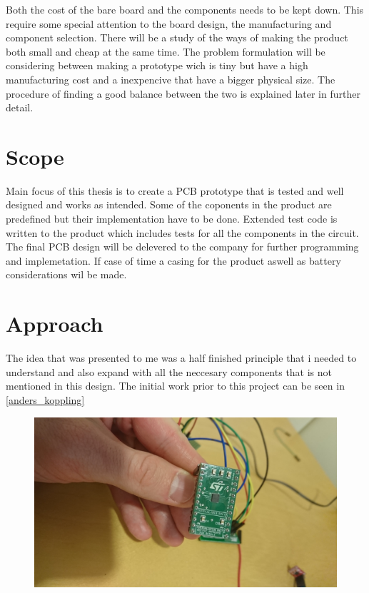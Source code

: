 Both the cost of the bare board and the components needs to be kept down.  This require some special attention to the board design, the manufacturing and component selection.
There will be a study of the ways of making the product both small and cheap at the same time. The problem formulation will be considering between making a prototype wich is tiny but have a high manufacturing cost and a inexpencive that have a bigger physical size. The procedure of finding a good balance between the two is explained later in further detail.

\section{Scope}
Main focus of this thesis is to create a PCB prototype that is tested and well designed and works as intended. Some of the coponents in the product are predefined but their implementation have to be done.
Extended test code is written to the product which includes tests for all the components in the circuit.  
The final PCB design will be delevered to the company for further programming and implemetation.
If case of time a casing for the product aswell as battery considerations wil be made.

\newpage
\section{Approach}
The idea that was presented to me was a half finished principle that i needed to understand and also expand with all the neccesary components that is not mentioned in this design. The initial work prior to this project can be seen in \autoref{anders_koppling}

\begin{figure}[H] 
	\centering 
	\includegraphics[width=.8\linewidth]{Figures/DSC_0103} 
	\label{fig:anders_koppling} 
\end{figure} 

